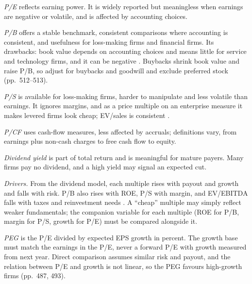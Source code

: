 \begin{qfmethod}\label{meth:alternative-multiples}
 \emph{P/E} reflects earning power. It is widely reported but meaningless when earnings are negative or volatile, and is affected by accounting choices.

\emph{P/B} offers a stable benchmark, consistent comparisons where accounting is consistent, and usefulness for loss-making firms and financial firms. Its drawbacks: book value depends on accounting choices and means little for service and technology firms, and it can be negative \citep[p.~511]{investment-valuation-2012}. Buybacks shrink book value and raise P/B, so adjust for buybacks and goodwill and exclude preferred stock (pp.~512--513).

\emph{P/S} is available for loss-making firms, harder to manipulate and less volatile than earnings. It ignores margins, and as a price multiple on an enterprise measure it makes levered firms look cheap; EV/sales is consistent \citep[pp.~542--543]{investment-valuation-2012}.

\emph{P/CF} uses cash-flow measures, less affected by accruals; definitions vary, from earnings plus non-cash charges to free cash flow to equity.

\emph{Dividend yield} is part of total return and is meaningful for mature payers. Many firms pay no dividend, and a high yield may signal an expected cut.

\emph{Drivers.} From the dividend model, each multiple rises with payout and growth and falls with risk. P/B also rises with ROE, P/S with margin, and EV/EBITDA falls with taxes and reinvestment needs \citep[pp.~460--461, 504]{investment-valuation-2012}. A ``cheap'' multiple may simply reflect weaker fundamentals; the companion variable for each multiple (ROE for P/B, margin for P/S, growth for P/E) must be compared alongside it.

\emph{PEG} is the P/E divided by expected EPS growth in percent. The growth base must match the earnings in the P/E, never a forward P/E with growth measured from next year. Direct comparison assumes similar risk and payout, and the relation between P/E and growth is not linear, so the PEG favours high-growth firms (pp.~487, 493).


\end{qfmethod}
